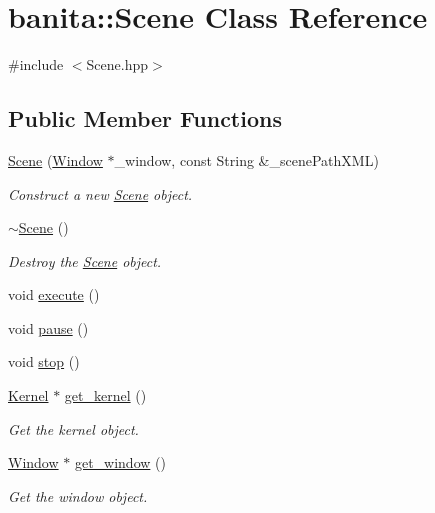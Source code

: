 \hypertarget{classbanita_1_1_scene}{}\section{banita\+::Scene Class Reference}
\label{classbanita_1_1_scene}


{\ttfamily \#include $<$Scene.\+hpp$>$}

\subsection*{Public Member Functions}
\begin{DoxyCompactItemize}
\item 
\mbox{\hyperlink{classbanita_1_1_scene_ac1cd51735d74d50dcefa500f715988a2}{Scene}} (\mbox{\hyperlink{classbanita_1_1_window}{Window}} $\ast$\+\_\+window, const String \&\+\_\+scene\+Path\+X\+ML)
\begin{DoxyCompactList}\small\item\em Construct a new \mbox{\hyperlink{classbanita_1_1_scene}{Scene}} object. \end{DoxyCompactList}\item 
\mbox{\hyperlink{classbanita_1_1_scene_a1c17873d5172df34c9a6a62dc3b13fa6}{$\sim$\+Scene}} ()
\begin{DoxyCompactList}\small\item\em Destroy the \mbox{\hyperlink{classbanita_1_1_scene}{Scene}} object. \end{DoxyCompactList}\item 
void \mbox{\hyperlink{classbanita_1_1_scene_aaf3588951958ee81114f0e58e5aead92}{execute}} ()
\item 
void \mbox{\hyperlink{classbanita_1_1_scene_a0b6fe86bd75f0baa4b7d8e259a8ebf07}{pause}} ()
\item 
void \mbox{\hyperlink{classbanita_1_1_scene_ad27b01f5b3a31a7fb81f5ec7dc6c63c6}{stop}} ()
\item 
\mbox{\hyperlink{classbanita_1_1_kernel}{Kernel}} $\ast$ \mbox{\hyperlink{classbanita_1_1_scene_adaa0e0879b6714fe1932562f6088892c}{get\+\_\+kernel}} ()
\begin{DoxyCompactList}\small\item\em Get the kernel object. \end{DoxyCompactList}\item 
\mbox{\hyperlink{classbanita_1_1_window}{Window}} $\ast$ \mbox{\hyperlink{classbanita_1_1_scene_ae3121d9444a4197d3f7ebfffd37d8a4a}{get\+\_\+window}} ()
\begin{DoxyCompactList}\small\item\em Get the window object. \end{DoxyCompactList}\item 

\end{DoxyCompactItemize}
